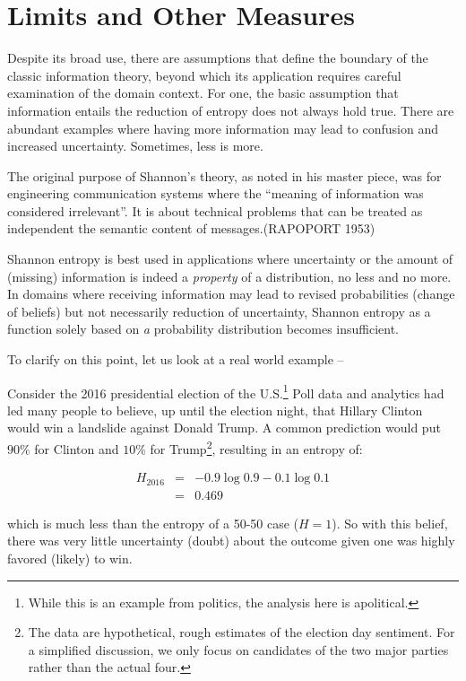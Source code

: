 \documentclass[
  letterpaper,
]{scrbook}
\begin{document}
\section{Limits and Other Measures}\label{limits-and-other-measures}

Despite its broad use, there are assumptions that define the boundary of
the classic information theory, beyond which its application requires
careful examination of the domain context. For one, the basic assumption
that information entails the reduction of entropy does not always hold
true. There are abundant examples where having more information may lead
to confusion and increased uncertainty. Sometimes, less is more.

The original purpose of Shannon's theory, as noted in his master piece,
was for engineering communication systems where the ``meaning of
information was considered irrelevant''. It is about technical problems
that can be treated as independent the semantic content of
messages.(RAPOPORT 1953)

Shannon entropy is best used in applications where uncertainty or the
amount of (missing) information is indeed a \emph{property} of a
distribution, no less and no more. In domains where receiving
information may lead to revised probabilities (change of beliefs) but
not necessarily reduction of uncertainty, Shannon entropy as a function
solely based on \emph{a} probability distribution becomes insufficient.

To clarify on this point, let us look at a real world example --

Consider the 2016 presidential election of the U.S.\footnote{While this
  is an example from politics, the analysis here is apolitical.} Poll
data and analytics had led many people to believe, up until the election
night, that Hillary Clinton would win a landslide against Donald Trump.
A common prediction would put \(90\%\) for Clinton and \(10\%\) for
Trump\footnote{The data are hypothetical, rough estimates of the
  election day sentiment. For a simplified discussion, we only focus on
  candidates of the two major parties rather than the actual four.},
resulting in an entropy of:

\[\begin{aligned}
  H_{2016}
  & = & - 0.9 \log 0.9 - 0.1 \log 0.1 \\
  & = & 0.469
\end{aligned}\]

which is much less than the entropy of a 50-50 case (\(H=1\)). So with
this belief, there was very little uncertainty (doubt) about the outcome
given one was highly favored (likely) to win.
\end{document}
